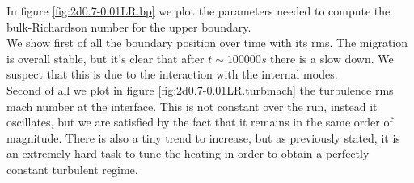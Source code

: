 \begin{figure}[t]
  \centering
      \hfill
	  \label{2d001-LRps2}
  \end{figure}
In figure \ref{fig:2d0.7-0.01LR.bp} we plot the parameters needed to compute the bulk-Richardson number for the upper boundary. \\
We show first of all the boundary position over time with its rms. The migration is overall stable, but it's clear that after $t \sim 100000 s$ there is a slow down. We suspect that this is due to the interaction with the internal modes. \\
Second of all we plot in figure \ref{fig:2d0.7-0.01LR.turbmach} the turbulence rms mach number at the interface. This is not constant over the run, instead it oscillates, but we are satisfied by the fact that it remains in the same order of magnitude. There is also a tiny trend to increase, but as previously stated, it is an extremely hard task to tune the heating in order to obtain a perfectly constant turbulent regime. \\
